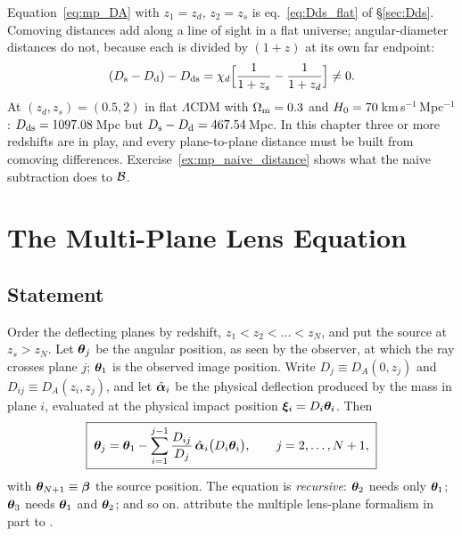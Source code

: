 \begin{bridge}
Equation~\eqref{eq:mp_DA} with $z_1=z_d$, $z_2=z_s$ is
eq.~\eqref{eq:Dds_flat} of \S\ref{sec:Dds}.  Comoving distances add along
a line of sight in a flat universe; angular-diameter distances do not,
because each is divided by $(1+z)$ at its own far endpoint:
\[
  (D_{\mathrm{s}}-D_{\mathrm{d}})-D_{\mathrm{ds}} = \chi_d\Big[\frac{1}{1+z_s}-\frac{1}{1+z_d}\Big]\neq 0 .
\]
At $(z_d,z_s)=(0.5,2)$ in flat $\Lambda$CDM with $\Omega_{\mathrm{m}}=0.3$ and
$H_0=70$\,km\,s$^{-1}$\,Mpc$^{-1}$: $D_{\mathrm{ds}}=1097.08$\,Mpc but
$D_{\mathrm{s}}-D_{\mathrm{d}}=467.54$\,Mpc.  In this chapter three or more redshifts are in
play, and every plane-to-plane distance must be built from
comoving differences.  Exercise~\ref{ex:mp_naive_distance} shows what
the naive subtraction does to $\mathcal{B}$.
\end{bridge}


\section{The Multi-Plane Lens Equation}
\label{sec:mp_multiplane}

\subsection{Statement}

Order the deflecting planes by redshift, $z_1<z_2<\dots<z_N$, and put
the source at $z_s>z_N$.  Let $\boldsymbol{\theta}_j$ be the angular position, as
seen by the observer, at which the ray crosses plane $j$; $\boldsymbol{\theta}_1$
is the observed image position.  Write $D_j\equiv D_A(0,z_j)$ and
$D_{ij}\equiv D_A(z_i,z_j)$, and let $\hat{\boldsymbol{\alpha}}_i$ be the physical
deflection produced by the mass in plane $i$, evaluated at the physical
impact position $\boldsymbol{\xi}_i=D_i\boldsymbol{\theta}_i$.  Then
\citep[\S9.1.1, eqs.~9.2--9.3]{schneider_ehlers_falco_1992}
\begin{equation}
    \boxed{\;
    \boldsymbol{\theta}_{j} = \boldsymbol{\theta}_{1} - \sum_{i=1}^{j-1}
    \frac{D_{ij}}{D_{j}}\,\hat{\boldsymbol{\alpha}}_i\big(D_i\boldsymbol{\theta}_i\big),
    \qquad j=2,\dots,N+1,\;}
    \label{eq:mp_multiplane}
\end{equation}
with $\boldsymbol{\theta}_{N+1}\equiv\boldsymbol{\beta}$ the source position.  The equation
is \emph{recursive}: $\boldsymbol{\theta}_2$ needs only $\boldsymbol{\theta}_1$;
$\boldsymbol{\theta}_3$ needs $\boldsymbol{\theta}_1$ and $\boldsymbol{\theta}_2$; and so on.
\citet[\S9]{schneider_ehlers_falco_1992} attribute the multiple
lens-plane formalism in part to \citet{blandford_narayan_1986}.

